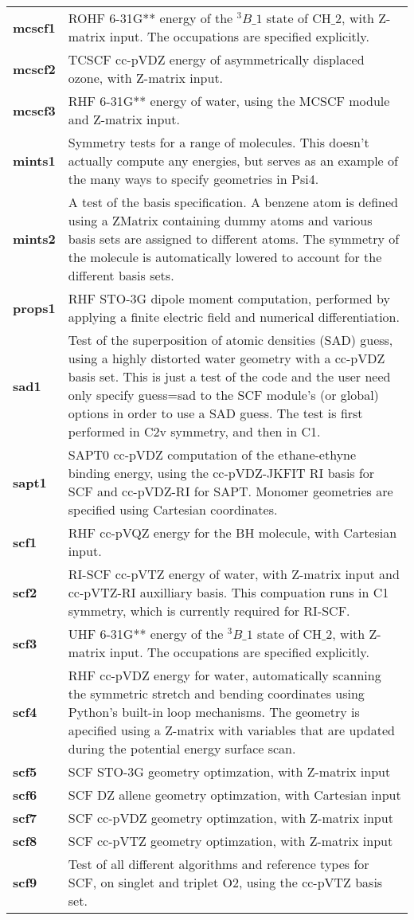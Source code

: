 \begin{tabular*}{\textwidth}[tb]{p{}p{}}
{\bf mcscf1} &  ROHF 6-31G** energy of the $^3B\_1$ state of CH$\_2$, with Z-matrix input. The occupations are specified explicitly.\\
{\bf mcscf2} &  TCSCF cc-pVDZ  energy of asymmetrically displaced ozone, with Z-matrix input.\\
{\bf mcscf3} &  RHF 6-31G** energy of water, using the MCSCF module and Z-matrix input.\\
{\bf mints1} &  Symmetry tests for a range of molecules.  This doesn't actually compute any energies, but serves as an example of the many ways to specify geometries in Psi4.\\
{\bf mints2} &  A test of the basis specification.  A benzene atom is defined using a ZMatrix containing dummy atoms and various basis sets are assigned to different atoms.  The symmetry of the molecule is automatically lowered to account for the different basis sets.\\
{\bf props1} &  RHF STO-3G dipole moment computation, performed by applying a finite electric field and numerical differentiation.\\
{\bf sad1} &  Test of the superposition of atomic densities (SAD) guess, using a highly distorted water geometry with a cc-pVDZ basis set.  This is just a test of the code and the user need only specify guess=sad to the SCF module's (or global) options in order to use a SAD guess. The test is first performed in C2v symmetry, and then in C1.\\
{\bf sapt1} &  SAPT0 cc-pVDZ computation of the ethane-ethyne binding energy, using the cc-pVDZ-JKFIT RI basis for SCF and cc-pVDZ-RI for SAPT.  Monomer geometries are specified using Cartesian coordinates.\\
{\bf scf1} &  RHF cc-pVQZ energy for the BH molecule, with Cartesian input.\\
{\bf scf2} &  RI-SCF cc-pVTZ energy of water, with Z-matrix input and cc-pVTZ-RI auxilliary basis. This compuation runs in C1 symmetry, which is currently required for RI-SCF.\\
{\bf scf3} &  UHF 6-31G** energy of the $^3B\_1$ state of CH$\_2$, with Z-matrix input. The occupations are specified explicitly.\\
{\bf scf4} &  RHF cc-pVDZ energy for water, automatically scanning the symmetric stretch and bending coordinates using Python's built-in loop mechanisms.  The geometry is apecified using a Z-matrix with variables that are updated during the potential energy surface scan.\\
{\bf scf5} &  SCF STO-3G geometry optimzation, with Z-matrix input\\
{\bf scf6} &  SCF DZ allene geometry optimzation, with Cartesian input\\
{\bf scf7} &  SCF cc-pVDZ geometry optimzation, with Z-matrix input\\
{\bf scf8} &  SCF cc-pVTZ geometry optimzation, with Z-matrix input\\
{\bf scf9} &  Test of all different algorithms and reference types for SCF, on singlet and triplet O2, using the cc-pVTZ basis set.\\
\end{tabular*}